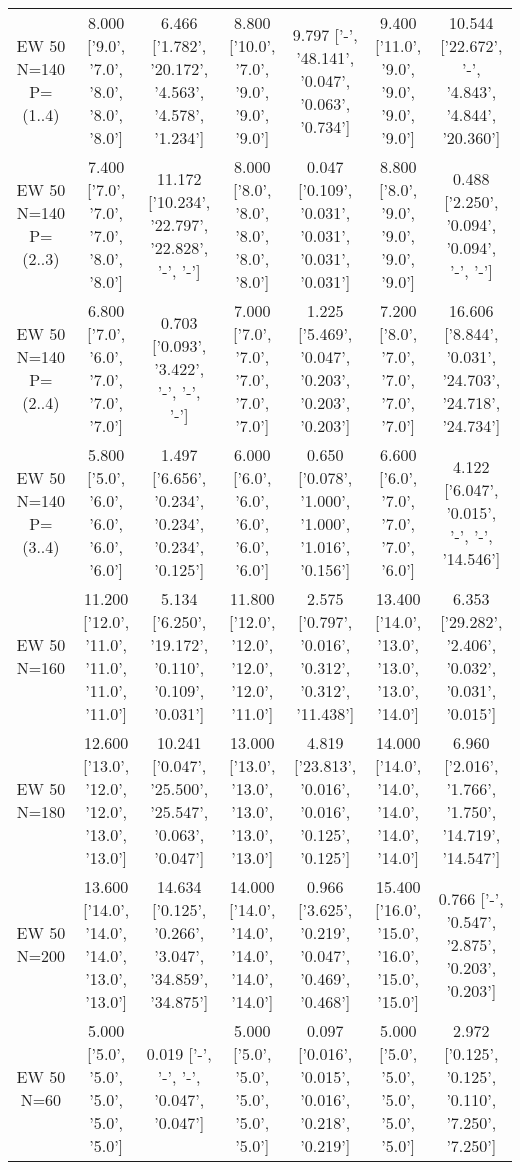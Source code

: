 \documentclass[landscape, 12pt]{report}
\begin{document}
\begin{tabular}{|c|cc|cc|cc|}
\\
EW 50 N=140 P=(1..4) & 8.000 ['9.0', '7.0', '8.0', '8.0', '8.0'] & 6.466 ['1.782', '20.172', '4.563', '4.578', '1.234'] & 8.800 ['10.0', '7.0', '9.0', '9.0', '9.0'] & 9.797 ['-', '48.141', '0.047', '0.063', '0.734'] & 9.400 ['11.0', '9.0', '9.0', '9.0', '9.0'] & 10.544 ['22.672', '-', '4.843', '4.844', '20.360']
\\
EW 50 N=140 P=(2..3) & 7.400 ['7.0', '7.0', '7.0', '8.0', '8.0'] & 11.172 ['10.234', '22.797', '22.828', '-', '-'] & 8.000 ['8.0', '8.0', '8.0', '8.0', '8.0'] & 0.047 ['0.109', '0.031', '0.031', '0.031', '0.031'] & 8.800 ['8.0', '9.0', '9.0', '9.0', '9.0'] & 0.488 ['2.250', '0.094', '0.094', '-', '-']
\\
EW 50 N=140 P=(2..4) & 6.800 ['7.0', '6.0', '7.0', '7.0', '7.0'] & 0.703 ['0.093', '3.422', '-', '-', '-'] & 7.000 ['7.0', '7.0', '7.0', '7.0', '7.0'] & 1.225 ['5.469', '0.047', '0.203', '0.203', '0.203'] & 7.200 ['8.0', '7.0', '7.0', '7.0', '7.0'] & 16.606 ['8.844', '0.031', '24.703', '24.718', '24.734']
\\
EW 50 N=140 P=(3..4) & 5.800 ['5.0', '6.0', '6.0', '6.0', '6.0'] & 1.497 ['6.656', '0.234', '0.234', '0.234', '0.125'] & 6.000 ['6.0', '6.0', '6.0', '6.0', '6.0'] & 0.650 ['0.078', '1.000', '1.000', '1.016', '0.156'] & 6.600 ['6.0', '7.0', '7.0', '7.0', '6.0'] & 4.122 ['6.047', '0.015', '-', '-', '14.546']
\\
EW 50 N=160 & 11.200 ['12.0', '11.0', '11.0', '11.0', '11.0'] & 5.134 ['6.250', '19.172', '0.110', '0.109', '0.031'] & 11.800 ['12.0', '12.0', '12.0', '12.0', '11.0'] & 2.575 ['0.797', '0.016', '0.312', '0.312', '11.438'] & 13.400 ['14.0', '13.0', '13.0', '13.0', '14.0'] & 6.353 ['29.282', '2.406', '0.032', '0.031', '0.015']
\\
EW 50 N=180 & 12.600 ['13.0', '12.0', '12.0', '13.0', '13.0'] & 10.241 ['0.047', '25.500', '25.547', '0.063', '0.047'] & 13.000 ['13.0', '13.0', '13.0', '13.0', '13.0'] & 4.819 ['23.813', '0.016', '0.016', '0.125', '0.125'] & 14.000 ['14.0', '14.0', '14.0', '14.0', '14.0'] & 6.960 ['2.016', '1.766', '1.750', '14.719', '14.547']
\\
EW 50 N=200 & 13.600 ['14.0', '14.0', '14.0', '13.0', '13.0'] & 14.634 ['0.125', '0.266', '3.047', '34.859', '34.875'] & 14.000 ['14.0', '14.0', '14.0', '14.0', '14.0'] & 0.966 ['3.625', '0.219', '0.047', '0.469', '0.468'] & 15.400 ['16.0', '15.0', '16.0', '15.0', '15.0'] & 0.766 ['-', '0.547', '2.875', '0.203', '0.203']
\\
EW 50 N=60 & 5.000 ['5.0', '5.0', '5.0', '5.0', '5.0'] & 0.019 ['-', '-', '-', '0.047', '0.047'] & 5.000 ['5.0', '5.0', '5.0', '5.0', '5.0'] & 0.097 ['0.016', '0.015', '0.016', '0.218', '0.219'] & 5.000 ['5.0', '5.0', '5.0', '5.0', '5.0'] & 2.972 ['0.125', '0.125', '0.110', '7.250', '7.250']

\end{tabular}
\end{document}
